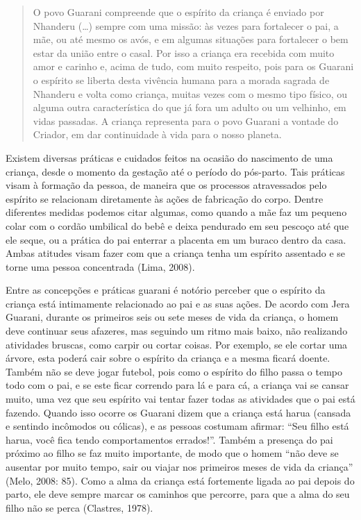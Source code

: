 \begin{quotation}
O povo Guarani compreende que o espírito da criança é enviado por
Nhanderu (\ldots{}) sempre com uma missão: às vezes para fortalecer o pai, a
mãe, ou até mesmo os avós, e em algumas situações para fortalecer o bem
estar da união entre o casal. Por isso a criança era recebida com muito
amor e carinho e, acima de tudo, com muito respeito, pois para os
Guarani o espírito se liberta desta vivência humana para a morada
sagrada de Nhanderu e volta como criança, muitas vezes com o mesmo tipo
físico, ou alguma outra característica do que já fora um adulto ou um
velhinho, em vidas passadas. A criança representa para o povo Guarani a
vontade do Criador, em dar continuidade à vida para o nosso planeta.
\end{quotation}

Existem diversas práticas e cuidados feitos na ocasião do nascimento de
uma criança, desde o momento da gestação até o período do pós-parto.
Tais práticas visam à formação da pessoa, de maneira que os processos
atravessados pelo espírito se relacionam diretamente às ações de
fabricação do corpo. Dentre diferentes medidas podemos citar algumas,
como quando a mãe faz um pequeno colar com o cordão umbilical do bebê e
deixa pendurado em seu pescoço até que ele seque, ou a prática do pai
enterrar a placenta em um buraco dentro da casa. Ambas atitudes visam
fazer com que a criança tenha um espírito assentado e se torne uma
pessoa concentrada (Lima, 2008).

Entre as concepções e práticas guarani é notório perceber que o espírito
da criança está intimamente relacionado ao pai e as suas ações. De
acordo com Jera Guarani, durante os primeiros seis ou sete meses de
vida da criança, o homem deve continuar seus afazeres, mas seguindo um
ritmo mais baixo, não realizando atividades bruscas, como carpir ou
cortar coisas. Por exemplo, se ele cortar uma árvore, esta poderá cair
sobre o espírito da criança e a mesma ficará doente. Também não se deve
jogar futebol, pois como o espírito do filho passa o tempo todo com o
pai, e se este ficar correndo para lá e para cá, a criança vai se
cansar muito, uma vez que seu espírito vai tentar fazer todas as
atividades que o pai está fazendo. Quando isso ocorre os Guarani dizem
que a criança está harua (cansada e sentindo incômodos ou cólicas), e
as pessoas costumam afirmar: ``Seu filho está harua, você fica tendo
comportamentos errados!''. Também a presença do pai próximo ao filho se
faz muito importante, de modo que o homem ``não deve se ausentar por
muito tempo, sair ou viajar nos primeiros meses de vida da criança''
(Melo, 2008: 85). Como a alma da criança está fortemente ligada ao pai
depois do parto, ele deve sempre marcar os caminhos que percorre, para
que a alma do seu filho não se perca (Clastres, 1978).

